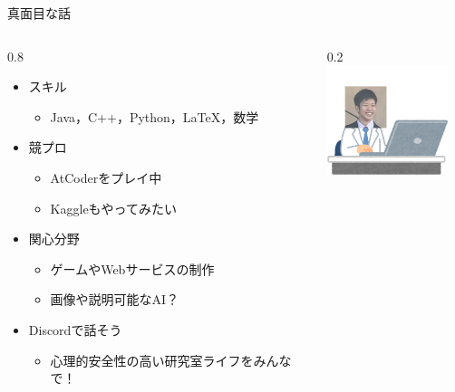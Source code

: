 \documentclass[aspectratio=169, dvipdfmx, 14pt, xcolor={svgnames,dvipsnames}]{beamer}
\newlength{\mytotalwidth}
\newlength{\mycolumnwidth}
\begin{document}
\begin{frame}{\quad 真面目な話}
  \begin{columns}[totalwidth=\mytotalwidth]
    \begin{column}[t]{0.8\mycolumnwidth}
      \begin{itemize}
        \item スキル
              \begin{itemize}
                \item Java，C++，Python，LaTeX，数学
              \end{itemize}
        \item 競プロ
              \begin{itemize}
                \item AtCoderをプレイ中
                \item Kaggleもやってみたい
              \end{itemize}
        \item 関心分野
              \begin{itemize}
                \item ゲームやWebサービスの制作
                \item 画像や説明可能なAI？
              \end{itemize}
        \item Discordで話そう
              \begin{itemize}
                \item 心理的安全性の高い研究室ライフをみんなで！
              \end{itemize}
      \end{itemize}
    \end{column}
    \begin{column}[T]{0.2\mycolumnwidth}
      \centering
      \includegraphics[width=100pt]{img/icon_pc.png}
    \end{column}
  \end{columns}
\end{frame}
\end{document}
